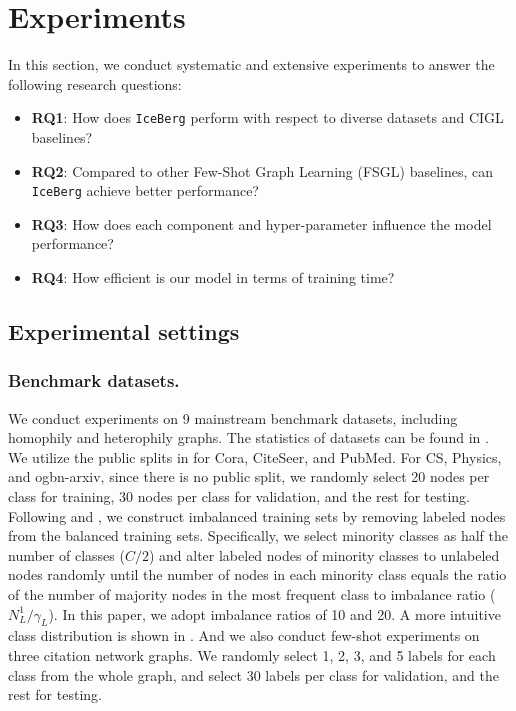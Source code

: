 \section{Experiments}
\label{sec:exp}

In this section, we conduct systematic and extensive experiments to answer the following research questions:
\begin{itemize}[leftmargin=*]
    \item \textbf{RQ1}: How does \texttt{IceBerg} perform with respect to diverse datasets and CIGL baselines?
    \item \textbf{RQ2}: Compared to other Few-Shot Graph Learning (FSGL) baselines, can \texttt{IceBerg} achieve better performance?
    \item \textbf{RQ3}: How does each component and hyper-parameter influence the model performance?
    \item \textbf{RQ4}: How efficient is our model in terms of training time?
\end{itemize}

\subsection{Experimental settings}

\subsubsection{Benchmark datasets.} We conduct experiments on 9 mainstream benchmark datasets, including homophily and heterophily graphs. The statistics of datasets can be found in . We utilize the public splits in \citet{yang2016revisiting} for Cora, CiteSeer, and PubMed. For CS, Physics, and ogbn-arxiv, since there is no public split, we randomly select 20 nodes per class for training, 30 nodes per class for validation, and the rest for testing. Following \citet{park2021graphens} and \citet{song2022tam}, we construct imbalanced training sets by removing labeled nodes from the balanced training sets. Specifically, we select minority classes as half the number of classes ($C/2$) and alter labeled nodes of minority classes to unlabeled nodes randomly until the number of nodes in each minority class equals the ratio of the number of majority nodes in the most frequent class to imbalance ratio ($N_L^1/\gamma_L$). In this paper, we adopt imbalance ratios of 10 and 20. A more intuitive class distribution is shown in . And we also conduct few-shot experiments on three citation network graphs. We randomly select 1, 2, 3, and 5 labels for each class from the whole graph, and select 30 labels per class for validation, and the rest for testing.


